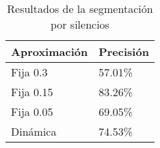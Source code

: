 \begin{table}[H]
\centering
\caption{Resultados de la segmentación por silencios}
\label{tab:resultados_segmentacion_silencios}
\begin{tabular}{|l|l|}
\textbf{Aproximación} & \textbf{Precisión} \\ \hline
Fija 0.3  & 57.01\% \\  \hline
Fija 0.15 & 83.26\% \\  \hline
Fija 0.05 & 69.05\% \\  \hline
Dinámica  & 74.53\% \\  \hline
\end{tabular}
\end{table}